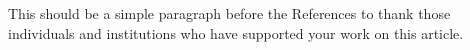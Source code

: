 This should be a simple paragraph before the References to thank those individuals and institutions who have supported your work on this article.